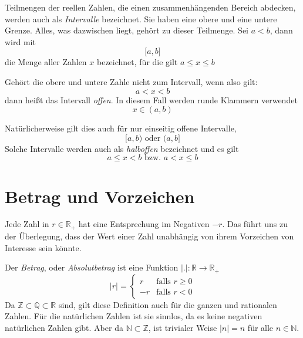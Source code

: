 \begin{definition}
Teilmengen der reellen Zahlen, die einen zusammenhängenden Bereich abdecken, werden auch als \textsl{Intervalle} bezeichnet. Sie haben eine obere und eine untere Grenze. Alles, was dazwischen liegt, gehört zu dieser Teilmenge. Sei $a<b$, dann wird mit
\[
\lbrack a,b \rbrack
\]
die Menge aller Zahlen $x$ bezeichnet, für die gilt $a\le x\le b$
\end{definition}

\begin{definition}
Gehört die obere und untere Zahle nicht zum Intervall, wenn also gilt:
\[
a<x<b
\]
dann heißt das Intervall \textsl{offen}. In diesem Fall werden runde Klammern verwendet
\[
x\in (a,b)
\]
\end{definition}

\begin{definition}
Natürlicherweise gilt dies auch für nur einseitig offene Intervalle, 
\[
\lbrack a,b) \text{ oder } (a,b\rbrack
\]
Solche Intervalle werden auch als \textsl{halboffen} bezeichnet und es gilt
\[
a\le x <b \text{ bzw. } a<x \le b
\]
\end{definition}

\section{Betrag und Vorzeichen}

Jede Zahl in $r\in \mathbb{R}_+$ hat eine Entsprechung im Negativen $-r$. Das führt uns zu der Überlegung, dass der Wert einer Zahl unabhängig von ihrem Vorzeichen von Interesse sein könnte.

\begin{definition}
Der \textsl{Betrag}, oder \textsl{Absolutbetrag} ist eine Funktion $\vert . \vert : \mathbb{R} \longrightarrow \mathbb{R}_+$
\begin{equation}
\vert r \vert = \begin{cases}
r & \text{falls } r\ge 0 \\
-r & \text{falls } r<0
\end{cases}
\end{equation}
Da $\mathbb{Z} \subset \mathbb{Q} \subset \mathbb{R}$ sind, gilt diese Definition auch für die ganzen und rationalen Zahlen. Für die natürlichen Zahlen ist sie sinnlos, da es keine negativen natürlichen Zahlen gibt. Aber da $\mathbb{N} \subset \mathbb{Z}$, ist trivialer Weise $\vert n \vert = n$ für alle $n\in \mathbb{N}$.
\end{definition}

